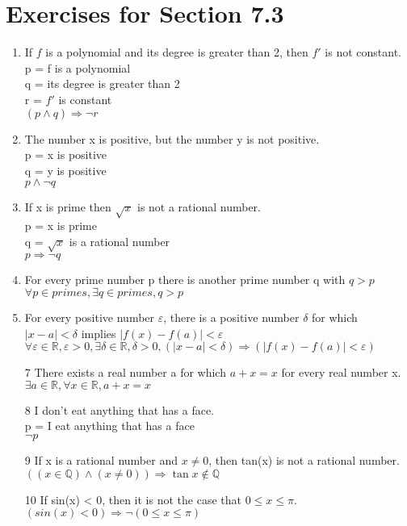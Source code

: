 \documentclass[12pt]{article}
\begin{document}
\section*{Exercises for Section 7.3}
\begin{enumerate}
	\item If $f$ is a polynomial and its degree is greater than 2, then $f'$ is not constant.\\
	    p = f is a polynomial\\
	    q = its degree is greater than 2\\
	    r = $f'$ is constant\\
	    $(p \land q) \Rightarrow \neg r$
	\item The number x is positive, but the number y is not positive.\\
	    p = x is positive\\
	    q = y is positive\\
	    $p \land \neg q$
	\item If x is prime then $\sqrt{x}$ is not a rational number.\\
	    p = x is prime\\
	    q = $\sqrt{x}$ is a rational number\\
	    $p \Rightarrow \neg q$
	\item For every prime number p there is another prime number q with $q>p$\\
	    $\forall p \in primes, \exists q \in primes, q > p$
	\item For every positive number $\varepsilon$, there is a positive number $\delta$ for which $|x-a| < \delta$ implies $|f(x) - f(a)| < \varepsilon$\\
	    $\forall \varepsilon \in \mathbb{R}, \varepsilon > 0, \exists \delta \in \mathbb{R}, \delta > 0, (|x-a| < \delta) \Rightarrow (|f(x) - f(a)| < \varepsilon)$
	\item [7] There exists a real number a for which $a+x=x$ for every real number x.\\
	    $\exists a \in \mathbb{R}, \forall x \in \mathbb{R}, a+x=x$
	\item [8] I don't eat anything that has a face.\\
	    p = I eat anything that has a face\\
	    $\neg p$
	\item [9] If x is a rational number and $x\neq 0$, then tan(x) is not a rational number.\\
	    $((x\in \mathbb{Q}) \land (x \neq 0)) \Rightarrow \tan{x} \notin \mathbb{ Q}$
	\item [10] If sin(x) < 0, then it is not the case that $0\le x \leq \pi$.\\
	    $(sin(x) < 0) \Rightarrow \neg(0\le x \le \pi)$
\end{enumerate}
\end{document}
